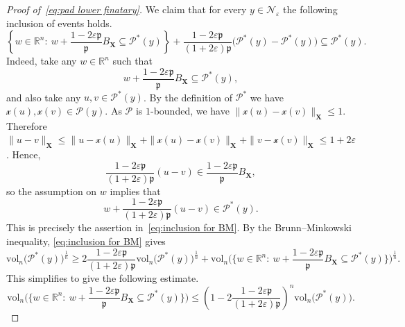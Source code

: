 \documentclass[11pt,reqno]{amsart}
\renewcommand{\le}{\leqslant}
\renewcommand{\ge}{\geqslant}
\newcommand{\X}{\mathbf X}
\newcommand{\e}{\varepsilon}
\newcommand{\R}{\mathbb R}
\theoremstyle{remark}
\renewcommand{\subset}{\subseteq}
\newcommand{\vol}{\mathrm{vol}}
\renewcommand{\1}{\mathbf 1}
\newcommand{\Part}{\mathscr{P}}
\newcommand{\cx}{\mathcal{x}}
\begin{document}
\begin{proof}[Proof of~\eqref{eq:pad lower finatary}]
 We claim that for every $y\in \mathcal{N}_\e$ the following inclusion of events holds.
\begin{equation}\label{eq:inclusion for BM}
\left\{w\in \R^n:\ w+\frac{1-2\e{\mathfrak{p}}}{{\mathfrak{p}}}B_{\X}\subset \Part^*(y)\right\}+\frac{1-2\e{\mathfrak{p}}}{(1+2\e){\mathfrak{p}}}\big(\Part^*(y)-\Part^*(y)\big)\subset \Part^*(y).
\end{equation}
Indeed, take any $w\in \R^n$ such that $$w+\frac{1-2\e{\mathfrak{p}}}{{\mathfrak{p}}}B_{\X}\subset \Part^*(y),$$ and also take any $u,v\in \Part^*(y)$. By the definition of $\Part^*$ we have $\cx(u),\cx(v)\in \Part(y)$. As $\Part$ is $1$-bounded, we have  $\|\cx(u)-\cx(v)\|_{\X}\le 1$. Therefore $\|u-v\|_{\X}\le \|u-\cx(u)\|_{\X}+\|\cx(u)-\cx(v)\|_{\X}+\|v-\cx(v)\|_{\X}\le 1+2\e$. Hence, $$\frac{1-2\e{\mathfrak{p}}}{(1+2\e){\mathfrak{p}}}(u-v)\in \frac{1-2\e{\mathfrak{p}}}{{\mathfrak{p}}}B_{\X},$$ so the assumption on $w$ implies that $$w+\frac{1-2\e{\mathfrak{p}}}{(1+2\e){\mathfrak{p}}}(u-v)\in \Part^*(y).$$ This is precisely the assertion in~\eqref{eq:inclusion for BM}. By the Brunn--Minkowski inequality, \eqref{eq:inclusion for BM} gives
$$
\vol_n\big(\Part^*(y)\big)^{\frac{1}{n}}\ge 2\frac{1-2\e{\mathfrak{p}}}{(1+2\e){\mathfrak{p}}}\vol_n\big(\Part^*(y)\big)^{\frac{1}{n}}+\vol_n\Big(\Big\{w\in \R^n:\ w+\frac{1-2\e{\mathfrak{p}}}{{\mathfrak{p}}}B_{\X}\subset \Part^*(y)\Big\}\Big)^{\frac{1}{n}}.
$$
This simplifies to give the following estimate.
\begin{equation}\label{eq:squeezed volume}
\vol_n\Big(\Big\{w\in \R^n:\ w+\frac{1-2\e{\mathfrak{p}}}{{\mathfrak{p}}}B_{\X}\subset \Part^*(y)\Big\}\Big)\le \left(1-2\frac{1-2\e{\mathfrak{p}}}{(1+2\e){\mathfrak{p}}}\right)^n\vol_n\big(\Part^*(y)\big).
\end{equation}



\end{proof}
\end{document}
